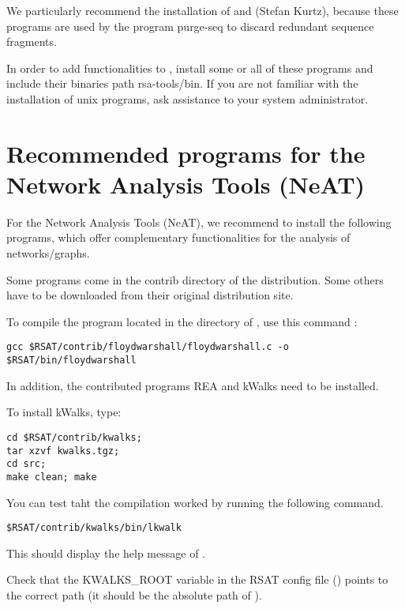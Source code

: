 \documentclass[12pt,a4paper, oneside]{scrreprt} %
\begin{document}
We particularly recommend the installation of  and
 (Stefan Kurtz), because these programs are used by
the program purge-seq to discard redundant sequence fragments.

In order to add functionalities to \RSAT, install some or all of these
programs and include their binaries path rsa-tools/bin. If you are not
familiar with the installation of unix programs, ask assistance to
your system administrator.


\section{Recommended programs for the Network Analysis Tools (NeAT)}


For the Network Analysis Tools (NeAT), we recommend to install the
following programs, which offer complementary functionalities for the
analysis of networks/graphs.

Some programs come in the contrib directory of the \RSAT
distribution. Some others have to be downloaded from their original
distribution site.

To compile the program  located in the
 directory of \RSAT, use this command :

\begin{lstlisting}
gcc $RSAT/contrib/floydwarshall/floydwarshall.c -o $RSAT/bin/floydwarshall
\end{lstlisting}


In addition, the contributed programs REA and kWalks need to be installed.

To install kWalks, type:


\begin{lstlisting}
cd $RSAT/contrib/kwalks; 
tar xzvf kwalks.tgz; 
cd src; 
make clean; make
\end{lstlisting}

You can test taht the compilation worked by running the following
command.

\begin{lstlisting}
$RSAT/contrib/kwalks/bin/lkwalk
\end{lstlisting}

This should display the help message of .

Check that the KWALKS\_ROOT variable in the RSAT config file
() points to the correct path (it
should be the absolute path of ).
\end{document}

